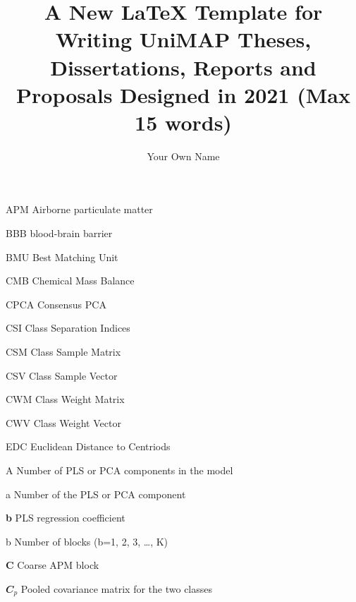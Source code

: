 \documentclass{unimapthesis}
\title{A New \LaTeX{} Template for Writing UniMAP Theses, Dissertations, Reports and Proposals Designed in 2021 (Max 15 words)}
\author{Your Own Name}
\begin{document}
\frontmatter

\maketitle


\begin{acknowl}
\blindtext 

\blindtext
\end{acknowl}


\tableofcontents
\listoftables
\listoffigures

\begin{abbrevs}
\item[APM] Airborne particulate matter
\item[BBB] blood-brain barrier
\item[BMU] Best Matching Unit
\item[CMB] Chemical Mass Balance
\item[CPCA] Consensus PCA
\item[CSI] Class Separation Indices
\item[CSM] Class Sample Matrix
\item[CSV] Class Sample Vector
\item[CWM] Class Weight Matrix
\item[CWV] Class Weight Vector
\item[EDC] Euclidean Distance to Centriods
\end{abbrevs}


\begin{symbols}
\item[A] Number of PLS or PCA components in the model
\item[a] Number of the PLS or PCA component
\item[\textbf{b}] PLS regression coefficient
\item[b] Number of blocks (b=1, 2, 3, \ldots, K)
\item[\textbf{C}] Coarse APM block
\item[$\mathbfit{C}_p$] Pooled covariance matrix for the two classes
\end{symbols}

\begin{msabstract}
\blindtext\blindtext\blindtext
\end{msabstract}

\begin{abstract}
\blindtext\blindtext\blindtext
\end{abstract}
\end{document}
